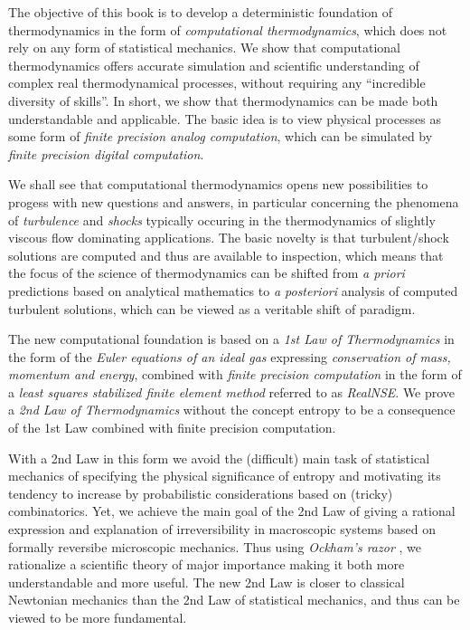 The objective of this book is to 
develop a deterministic foundation of thermodynamics in the form of
\emph{computational thermodynamics}, which does not rely on any form of 
statistical mechanics. We show that
computational thermodynamics offers accurate simulation
and scientific understanding of complex real thermodynamical processes,
without requiring any ``incredible diversity of skills''. In short,
we show that thermodynamics can be made both understandable and applicable.
The basic idea is to view physical processes 
as some form of \emph{finite precision analog computation}, 
which can be simulated by \emph{finite precision digital computation}.


We shall see  that computational thermodynamics opens new possibilities 
to progess with new questions and answers, in particular concerning 
the phenomena of \emph{turbulence} and \emph{shocks} typically occuring
in the thermodynamics of slightly viscous flow dominating applications.
The basic novelty is that turbulent/shock solutions are computed and thus 
are available to inspection, which means that the focus of the science
of thermodynamics can be shifted from \emph{a priori} predictions 
based on analytical mathematics to \emph{a posteriori} analysis of 
computed turbulent solutions, which can be viewed as a 
veritable shift of paradigm.

The new computational foundation is based on a 
\emph{1st Law of Thermodynamics} in the form of 
the \emph{Euler equations of an ideal gas} 
expressing \emph{conservation of mass, momentum and energy},
combined with \emph{finite precision computation} in the form of
a \emph{least squares stabilized finite element method} 
referred to as \emph{RealNSE}.
We prove a \emph{2nd Law of Thermodynamics} without the concept entropy 
to be a consequence of the 1st Law combined with finite precision computation.

With a 2nd Law in this form we avoid the (difficult) main task of 
statistical mechanics of specifying the physical significance of 
entropy and motivating its tendency to increase by probabilistic 
considerations based on (tricky) combinatorics. Yet, we achieve the
main goal of the 2nd Law of giving a rational expression
and explanation of irreversibility in macroscopic systems based on formally
reversibe microscopic mechanics.
Thus using \emph{Ockham's razor} \cite{ockham},
we rationalize a scientific theory of major importance making it both
more understandable and more useful. The new 2nd Law is closer to 
classical Newtonian mechanics than the 2nd Law of statistical mechanics, 
and thus can be viewed to be more fundamental.

